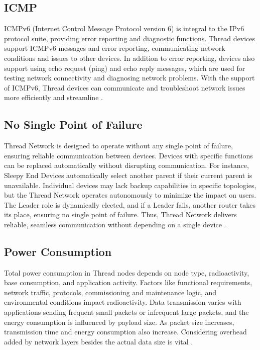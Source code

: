 \subsection{ICMP}
ICMPv6 (Internet Control Message Protocol version 6) is integral to the IPv6 protocol suite, providing error reporting and diagnostic functions. Thread devices support ICMPv6 messages and error reporting, communicating network conditions and issues to other devices. In addition to error reporting, devices also support using echo request (ping) and echo reply messages, which are used for testing network connectivity and diagnosing network problems. With the support of ICMPv6, Thread devices can communicate and troubleshoot network issues more efficiently and streamline \cite{Thread_Group_Fundamentals}.

\subsection{No Single Point of Failure}
Thread Network is designed to operate without any single point of failure, ensuring reliable communication between devices. Devices with specific functions can be replaced automatically without disrupting communication. For instance, Sleepy End Devices automatically select another parent if their current parent is unavailable. Individual devices may lack backup capabilities in specific topologies, but the Thread Network operates autonomously to minimize the impact on users. The Leader role is dynamically elected, and if a Leader fails, another router takes its place, ensuring no single point of failure. Thus, Thread Network delivers reliable, seamless communication without depending on a single device \cite{8373620}.

\subsection{Power Consumption}
Total power consumption in Thread nodes depends on node type, radioactivity, base consumption, and application activity. Factors like functional requirements, network traffic, protocols, commissioning and maintenance logic, and environmental conditions impact radioactivity. Data transmission varies with applications sending frequent small packets or infrequent large packets, and the energy consumption is influenced by payload size. As packet size increases, transmission time and energy consumption also increase. Considering overhead added by network layers besides the actual data size is vital \cite{semiconductor_battery_2021}.


